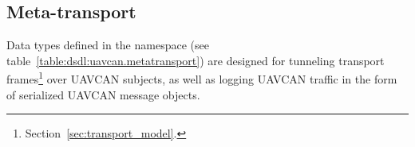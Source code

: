 
\subsection{Meta-transport}

Data types defined in the namespace 
(see table~\ref{table:dsdl:uavcan.metatransport})
are designed for tunneling transport frames\footnote{Section~\ref{sec:transport_model}.}
over UAVCAN subjects,
as well as logging UAVCAN traffic in the form of serialized UAVCAN message objects.

